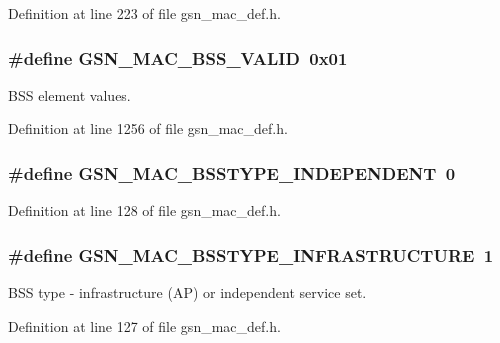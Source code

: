 Definition at line 223 of file gsn\_\-mac\_\-def.h.

\hypertarget{a00642_ga98d81e9fac7e3e57bb933a0e8774312b}{
\subsubsection[{GSN\_\-MAC\_\-BSS\_\-VALID}]{\setlength{\rightskip}{0pt plus 5cm}\#define GSN\_\-MAC\_\-BSS\_\-VALID~0x01}}
\label{a00642_ga98d81e9fac7e3e57bb933a0e8774312b}


BSS element values. 



Definition at line 1256 of file gsn\_\-mac\_\-def.h.

\hypertarget{a00642_ga87bb2904a9980d0ecf8f90a9def53f8b}{
\subsubsection[{GSN\_\-MAC\_\-BSSTYPE\_\-INDEPENDENT}]{\setlength{\rightskip}{0pt plus 5cm}\#define GSN\_\-MAC\_\-BSSTYPE\_\-INDEPENDENT~0}}
\label{a00642_ga87bb2904a9980d0ecf8f90a9def53f8b}


Definition at line 128 of file gsn\_\-mac\_\-def.h.

\hypertarget{a00642_ga2372fc9534269f16c2e02d4c02bd9678}{
\subsubsection[{GSN\_\-MAC\_\-BSSTYPE\_\-INFRASTRUCTURE}]{\setlength{\rightskip}{0pt plus 5cm}\#define GSN\_\-MAC\_\-BSSTYPE\_\-INFRASTRUCTURE~1}}
\label{a00642_ga2372fc9534269f16c2e02d4c02bd9678}


BSS type -\/ infrastructure (AP) or independent service set. 



Definition at line 127 of file gsn\_\-mac\_\-def.h.


